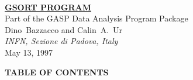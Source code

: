 \topmargin 0cm
\textwidth15cm
\parindent1cm


~\vskip9cm
\begin{center}
{\Large\bf\underline{GSORT PROGRAM}} \\
\bigskip
Part of the GASP Data Analysis Program Package\\
\bigskip
\bigskip
{Dino~Bazzacco and Calin~A.~Ur} \\
\bigskip
{\small\it INFN, Sezione di Padova, Italy}\\
\bigskip
May 13, 1997
\end{center}

\newpage
\begin{center}
{\large\bf TABLE OF CONTENTS} \\
\end{center}
\bigskip
\bigskip

